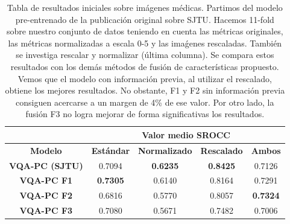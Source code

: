 \begin{table}[htp]
  \scriptsize
  \centering
\begin{tabular}{|c|cccc|}
\hline
\rowcolor[HTML]{FFC702}
                       & \multicolumn{4}{c|}{\textbf{Valor medio SROCC}}                                                                                                    \\ \hline
\rowcolor[HTML]{FFC702}
\textbf{Modelo}        & \multicolumn{1}{c|}{\textbf{Estándar}} & \multicolumn{1}{c|}{\textbf{Normalizado}} & \multicolumn{1}{c|}{\textbf{Rescalado}} & \textbf{Ambos}  \\ \hline
\textbf{VQA-PC (SJTU)} & \multicolumn{1}{c|}{0.7094}            & \multicolumn{1}{c|}{\textbf{0.6235}}      & \multicolumn{1}{c|}{\textbf{0.8425}}    & 0.7126          \\ \hline
\textbf{VQA-PC F1}     & \multicolumn{1}{c|}{\textbf{0.7305}}   & \multicolumn{1}{c|}{0.6140}               & \multicolumn{1}{c|}{0.8164}             & 0.7291          \\ \hline
\textbf{VQA-PC F2}     & \multicolumn{1}{c|}{0.6816}            & \multicolumn{1}{c|}{0.5770}               & \multicolumn{1}{c|}{0.8057}             & \textbf{0.7324} \\ \hline
\textbf{VQA-PC F3}     & \multicolumn{1}{c|}{0.7080}            & \multicolumn{1}{c|}{0.5671}      & \multicolumn{1}{c|}{0.7482}             & 0.7006          \\ \hline
\end{tabular}
\caption[Valor medio sobre imágenes médicas.]{Tabla de resultados iniciales sobre imágenes médicas. 
Partimos del modelo pre-entrenado de la publicación original \cite{VQA-PC} sobre SJTU\cite{SJTU}. Hacemos 
11-fold sobre nuestro conjunto de datos teniendo en cuenta las métricas originales, las métricas
normalizadas a escala 0-5 y las imaǵenes rescaladas. También se investiga rescalar y normalizar (última columna).
Se compara estos resultados con los demás métodos de fusión de características propuesto.
Vemos que el modelo con información previa, al utilizar el rescalado, obtiene los mejores resultados.
No obstante, F1 y F2 sin información previa consiguen acercarse a un margen de 4\% de ese valor. 
Por otro lado, la fusión F3 no logra mejorar de forma significativas los resultados. 
}
\end{table}

